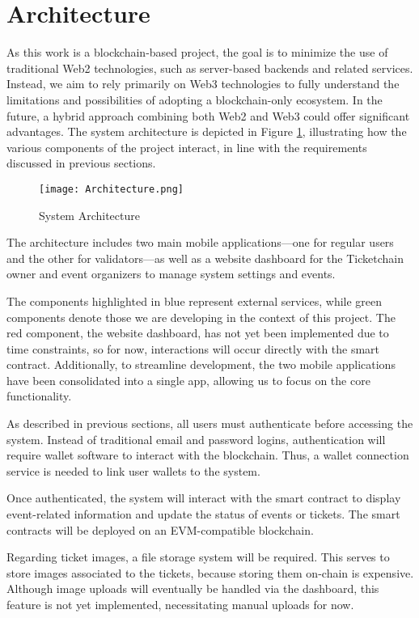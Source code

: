 \section{Architecture}
\label{sec:architecture}

As this work is a blockchain-based project, the goal is to minimize the use of
traditional Web2 technologies, such as server-based backends and related
services. Instead, we aim to rely primarily on Web3 technologies to fully
understand the limitations and possibilities of adopting a blockchain-only
ecosystem. In the future, a hybrid approach combining both Web2 and Web3 could
offer significant advantages. The system architecture is depicted in Figure
\ref{fig:architecture}, illustrating how the various components of the project
interact, in line with the requirements discussed in previous sections.

\begin{figure}[H]
    \centering
    \texttt{[image: Architecture.png]}
    \caption{System Architecture}
    \label{fig:architecture}
\end{figure}

The architecture includes two main mobile applications—one for regular users
and the other for validators—as well as a website dashboard for the Ticketchain
owner and event organizers to manage system settings and events.

The components highlighted in blue represent external services, while green
components denote those we are developing in the context of this project. The
red component, the website dashboard, has not yet been implemented due to time
constraints, so for now, interactions will occur directly with the smart
contract. Additionally, to streamline development, the two mobile applications
have been consolidated into a single app, allowing us to focus on the core
functionality.

As described in previous sections, all users must authenticate before accessing
the system. Instead of traditional email and password logins, authentication
will require wallet software to interact with the blockchain. Thus, a wallet
connection service is needed to link user wallets to the system.

Once authenticated, the system will interact with the smart contract to display
event-related information and update the status of events or tickets. The smart
contracts will be deployed on an EVM-compatible blockchain.

Regarding ticket images, a file storage system will be required. This serves to
store images associated to the tickets, because storing them on-chain is
expensive. Although image uploads will eventually be handled via the dashboard,
this feature is not yet implemented, necessitating manual uploads for now.
